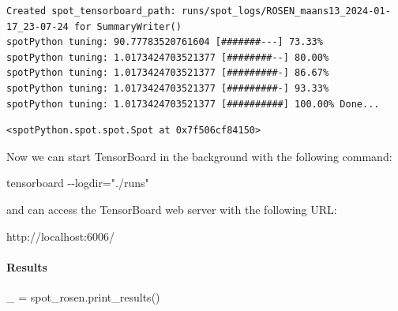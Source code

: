 \documentclass[
  letterpaper,
  DIV=11,
  numbers=noendperiod]{scrreprt}
\let\oldparagraph\paragraph
\renewcommand{\paragraph}[1]{\oldparagraph{#1}\mbox{}}
\newenvironment{Shaded}{\begin{snugshade}}{\end{snugshade}}
\newcommand{\NormalTok}[1]{\textcolor[rgb]{0.00,0.23,0.31}{#1}}
\newcommand{\OperatorTok}[1]{\textcolor[rgb]{0.37,0.37,0.37}{#1}}
\begin{document}
\begin{verbatim}
Created spot_tensorboard_path: runs/spot_logs/ROSEN_maans13_2024-01-17_23-07-24 for SummaryWriter()
spotPython tuning: 90.77783520761604 [#######---] 73.33% 
spotPython tuning: 1.0173424703521377 [########--] 80.00% 
spotPython tuning: 1.0173424703521377 [#########-] 86.67% 
spotPython tuning: 1.0173424703521377 [#########-] 93.33% 
spotPython tuning: 1.0173424703521377 [##########] 100.00% Done...
\end{verbatim}

\begin{verbatim}
<spotPython.spot.spot.Spot at 0x7f506cf84150>
\end{verbatim}

\begin{tcolorbox}[enhanced jigsaw, coltitle=black, bottomrule=.15mm, breakable, toprule=.15mm, colframe=quarto-callout-note-color-frame, title=\textcolor{quarto-callout-note-color}{\faInfo}\hspace{0.5em}{Note}, colbacktitle=quarto-callout-note-color!10!white, opacityback=0, left=2mm, leftrule=.75mm, colback=white, rightrule=.15mm, bottomtitle=1mm, toptitle=1mm, titlerule=0mm, arc=.35mm, opacitybacktitle=0.6]

Now we can start TensorBoard in the background with the following
command:

\begin{Shaded}
\begin{Highlighting}[]
\NormalTok{tensorboard {-}{-}logdir="./runs"}
\end{Highlighting}
\end{Shaded}

and can access the TensorBoard web server with the following URL:

\begin{Shaded}
\begin{Highlighting}[]
\NormalTok{http://localhost:6006/}
\end{Highlighting}
\end{Shaded}

\end{tcolorbox}

\paragraph{Results}\label{results-4}

\begin{Shaded}
\begin{Highlighting}[]
\NormalTok{\_ }\OperatorTok{=}\NormalTok{ spot\_rosen.print\_results()}
\end{Highlighting}
\end{Shaded}
\end{document}
